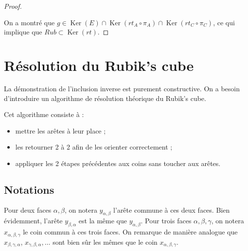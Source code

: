 \documentclass[french]{report}
\begin{document}
\begin{proof}
\begin{enumerate}
    \end{enumerate}
    On a montré que $g \in \operatorname{Ker}(E) \cap \operatorname{Ker}(rt_A \circ \pi_A) \cap \operatorname{Ker}(rt_C \circ \pi_C)$, ce qui implique que $Rub \subset \operatorname{Ker}(rt).$
  \end{proof}


\chapter{Résolution du Rubik's cube} \label{chap_resolution}

La démonstration de l'inclusion inverse est purement constructive. On a besoin d'introduire un algorithme de résolution théorique du Rubik's cube.

Cet algorithme consiste à :

\begin{itemize}
  \item mettre les arêtes à leur place ;
  \item les retourner 2 à 2 afin de les orienter correctement ;
  \item appliquer les 2 étapes précédentes aux coins sans toucher aux arêtes.
\end{itemize}

\section*{Notations}


Pour deux faces $\alpha, \beta $, on notera $y _{\alpha, \beta }$ l'arête commune à ces deux faces. Bien évidemment, l'arête $y _{\beta , \alpha}$ est la même que $y _{\alpha, \beta }$. Pour trois faces $\alpha, \beta, \gamma $, on notera $x _{\alpha, \beta , \gamma }$ le coin commun à ces trois faces. On remarque de manière analogue que $x _{\beta , \gamma , \alpha}$, $x _{\gamma , \beta ,\alpha}, \dots$ sont bien sûr les mêmes que le coin $x _{\alpha, \beta ,\gamma }$.

\end{document}
